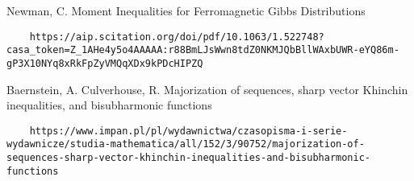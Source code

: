 \documentclass[10pt]{article}
\newcommand{\1}{\textbf{1}}
\theoremstyle{remark}
\theoremstyle{definition}
\begin{document}
\begin{thebibliography}{9}
 Newman, C. Moment Inequalities for Ferromagnetic Gibbs Distributions

\begin{verbatim}
	https://aip.scitation.org/doi/pdf/10.1063/1.522748?casa_token=Z_1AHe4y5o4AAAAA:r88BmLJsWwn8tdZ0NKMJQbBllWAxbUWR-eYQ86m-gP3X10NYq8xRkFpZyVMQqXDx9kPDcHIPZQ
\end{verbatim}

 Baernstein, A. Culverhouse, R. Majorization of sequences, sharp vector Khinchin inequalities, and bisubharmonic functions

\begin{verbatim}
	https://www.impan.pl/pl/wydawnictwa/czasopisma-i-serie-wydawnicze/studia-mathematica/all/152/3/90752/majorization-of-sequences-sharp-vector-khinchin-inequalities-and-bisubharmonic-functions
\end{verbatim}

\end{thebibliography}
\end{document}
